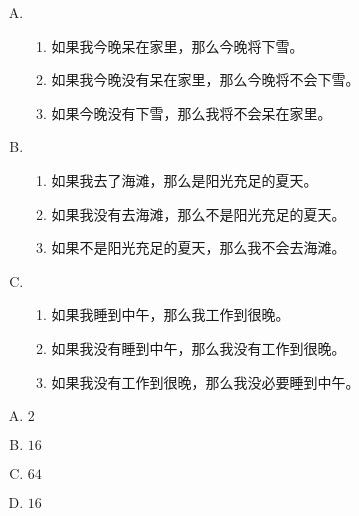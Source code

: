 {{        %
        \begin{practices}
            \begin{enumerate}[A.]
                \item
                {
                    \begin{enumerate}[1)]
                        \item 如果我今晚呆在家里，那么今晚将下雪。
                        \item 如果我今晚没有呆在家里，那么今晚将不会下雪。
                        \item 如果今晚没有下雪，那么我将不会呆在家里。
                    \end{enumerate}
                }
                \item
                {
                    \begin{enumerate}[1)]
                        \item 如果我去了海滩，那么是阳光充足的夏天。
                        \item 如果我没有去海滩，那么不是阳光充足的夏天。
                        \item 如果不是阳光充足的夏天，那么我不会去海滩。
                    \end{enumerate}
                }
                \item
                {
                    \begin{enumerate}[1)]
                        \item 如果我睡到中午，那么我工作到很晚。
                        \item 如果我没有睡到中午，那么我没有工作到很晚。
                        \item 如果我没有工作到很晚，那么我没必要睡到中午。
                    \end{enumerate}
                }
            \end{enumerate}
        \end{practices}

        \begin{practices}
            \begin{enumerate}[A.]
                \item $2$
                \item $16$
                \item $64$
                \item $16$
            \end{enumerate}
        \end{practices}
        
}}
